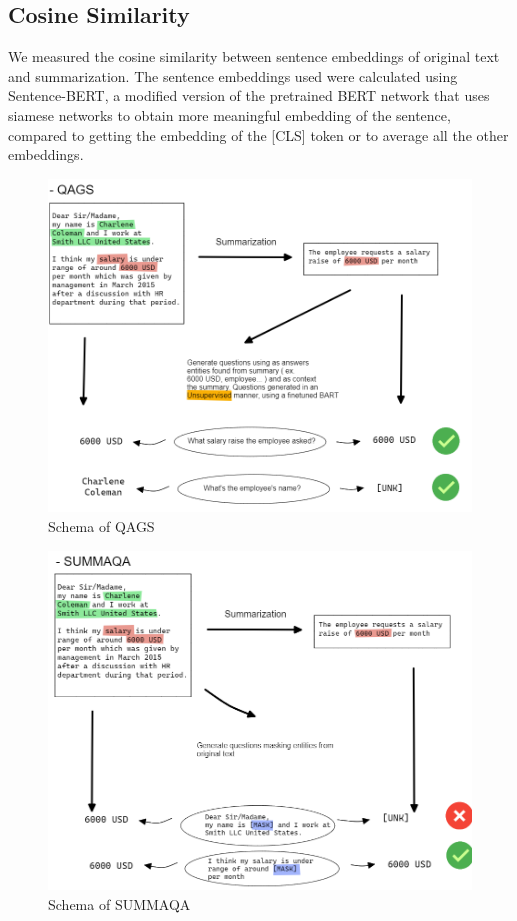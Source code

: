\subsection*{Cosine Similarity}
We measured the cosine similarity between sentence embeddings of original text and summarization. The sentence embeddings used were calculated using Sentence-BERT, a modified version of the pretrained BERT network that uses siamese networks to obtain more meaningful embedding of the sentence, compared to getting the embedding of the [CLS] token or to average all the other embeddings.


\begin{figure}[h] 
    \includegraphics[width=\textwidth]{images/qa_models_qags.png}
    \caption{Schema of QAGS}
    \label{fig:schema_qags}
\end{figure}    

\begin{figure}[h] 
    \includegraphics[width=\textwidth]{images/qa_models_summaqa.png}
    \caption{Schema of SUMMAQA}
    \label{fig:schema_summa_qa}
\end{figure}    

